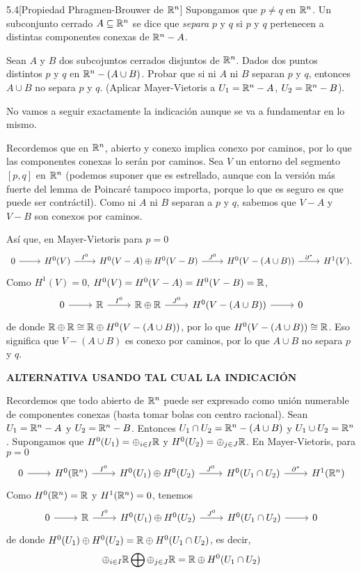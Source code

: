 \documentclass[twoside]{article}
\begin{document}
\begin{ejercicio}{5.4}[Propiedad Phragmen-Brouwer de $\mathbb{R}^n$]  Supongamos que $p\neq q$ en $\mathbb{R}^n$. Un subconjunto cerrado $A\subseteq\mathbb{R}^n$ se dice que \emph{separa} $p$ y $q$ si $p$ y $q$ pertenecen a distintas componentes conexas de $\mathbb{R}^n-A$. 

Sean $A$ y $B$ dos subcojuntos cerrados disjuntos de $\mathbb{R}^n$. Dados dos puntos distintos $p$ y $q$ en $\mathbb{R}^n-(A\cup B)$. Probar que si ni $A$ ni $B$ separan $p$ y $q$, entonces $A\cup B$ no separa $p$ y $q$. (Aplicar Mayer-Vietoris a $U_1=\mathbb{R}^n-A$, $U_2=\mathbb{R}^n-B$).

\end{ejercicio}
\begin{solucion}
No vamos a seguir exactamente la indicación aunque se va a fundamentar en lo mismo.

Recordemos que en $\mathbb{R}^n$, abierto y conexo implica conexo por caminos, por lo que las componentes conexas lo serán por caminos. Sea $V$ un entorno del segmento $[p,q]$ en $\mathbb{R}^n$ (podemos suponer que es estrellado, aunque con la versión más fuerte del lemma de Poincaré tampoco importa, porque lo que es seguro es que puede ser contráctil). Como ni $A$ ni $B$ separan a $p$ y $q$, sabemos que $V-A$ y $V-B$ son conexos por caminos. 

Así que, en Mayer-Vietoris para $p=0$
\[
\begin{tikzcd}
0\arrow[r] & H^0(V)\arrow[r,"I^0"] & H^0(V-A)\oplus H^0(V-B)\arrow[r, "J^0"] & H^0(V-(A\cup B))\arrow[r,"\partial^*"] & H^1(V).
\end{tikzcd}
\]
Como $H^1(V)=0$, $H^0(V)=H^0(V-A)=H^0(V-B)=\mathbb{R}$,
\[
\begin{tikzcd}
0\arrow[r] & \R\arrow[r,"I^0"] & \R\oplus \R\arrow[r, "J^0"] & H^0(V-(A\cup B))\arrow[r]& 0
\end{tikzcd}
\]
de donde $\mathbb{R}\oplus\mathbb{R}\cong \mathbb{R}\oplus  H^0(V-(A\cup B))$, por lo que $H^0(V-(A\cup B))\cong\mathbb{R}$. Eso significa que $V-(A\cup B)$ es conexo por caminos, por lo que $A\cup B$ no separa $p$ y $q$. 

{\bf\large ALTERNATIVA USANDO TAL CUAL LA INDICACIÓN}

Recordemos que todo abierto de $\mathbb{R}^n$ puede ser expresado como unión numerable de componentes conexas (basta tomar bolas con centro racional). Sean $U_1=\mathbb{R}^n-A$ y $U_2=\mathbb{R}^n-B$. Entonces $U_1\cap U_2=\mathbb{R}^n-(A\cup B)$ y $U_1\cup U_2=\mathbb{R}^n$. Supongamos que $H^0(U_1)=\oplus_{i\in I}\mathbb{R}$ y $H^0(U_2)=\oplus_{j\in J}\mathbb{R}$. En Mayer-Vietoris, para $p=0$
\[
\begin{tikzcd}
0\arrow[r] & H^0(\R^n)\arrow[r,"I^0"] & H^0(U_1)\oplus H^0(U_2)\arrow[r, "J^0"] & H^0(U_1\cap U_2)\arrow[r,"\partial^*"] & H^1(\R^n)
\end{tikzcd}
\]
Como $H^0(\mathbb{R}^n)=\mathbb{R}$ y $H^1(\mathbb{R}^n)=0$, tenemos
\[
\begin{tikzcd}
0\arrow[r] & \R \arrow[r,"I^0"] & H^0(U_1)\oplus H^0(U_2)\arrow[r, "J^0"] & H^0(U_1\cap U_2)\arrow[r] & 0
\end{tikzcd}
\]
de donde $ H^0(U_1)\oplus H^0(U_2)=\mathbb{R}\oplus H^0(U_1\cap U_2)$, es decir,
\[
\oplus_{i\in I}\mathbb{R}\bigoplus \oplus_{j\in J}\mathbb{R} =\mathbb{R}\oplus H^0(U_1\cap U_2)
\]
\end{solucion}
\end{document}
